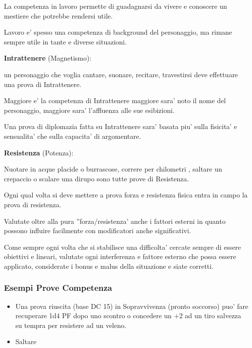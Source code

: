 \documentclass[a4paper,11pt,twoside,openany]{book}
\begin{document}
La competenza in lavoro permette di guadagnarsi da vivere e conoscere un mestiere che potrebbe rendersi utile.

Lavoro e' spesso una competenza di background del personaggio, ma rimane sempre utile in tante e diverse situazioni.

\textbf{Intrattenere} (Magnetismo):

un personaggio che voglia cantare, suonare, recitare, travestirsi deve effettuare una prova di Intrattenere.

Maggiore e' la competenza di Intrattenere maggiore sara' noto il nome del personaggio, maggiore sara' l'affluenza alle sue esibizioni.

Una prova di diplomazia fatta su Intrattenere sara' basata piu' sulla fisicita' e sensualita' che sulla capacita' di argomentare.

\textbf{Resistenza} (Potenza):

Nuotare in acque placide o burrascose, correre per chilometri , saltare un crepaccio o scalare una dirupo sono tutte prove di Resistenza.

Ogni qual volta si deve mettere a prova forza e resistenza fisica entra in campo la prova di resistenza.

Valutate oltre alla pura ''forza/resistenza' anche i fattori esterni in quanto possono influire facilmente con modificatori anche significativi.

\bigskip

Come sempre ogni volta che si stabilisce una difficolta' cercate sempre di essere obiettivi e lineari, valutate ogni interferenza e fattore esterno che possa essere applicato, considerate i bonus e malus della situazione e siate corretti.

\subsubsection{Esempi Prove Competenza}

\label{esempi-prove-competenza}

\begin{itemize}
	\item Una prova riuscita (base DC 15) in Sopravvivenza (pronto soccorso) puo' fare recuperare 1d4 PF dopo uno scontro o concedere un +2 ad un tiro salvezza su tempra per resistere ad un veleno.
\end{itemize}

\begin{itemize}
	\item Saltare	
\end{itemize}
\end{document}
